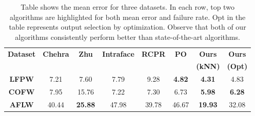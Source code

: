 \begin{table}%
   \centering
   \begin{tabular}{c c c c c c c c}
    \toprule[1.5pt]
     {\bf Dataset} &  {\bf Chehra} &  {\bf Zhu} &  {\bf Intraface} &  {\bf RCPR} & {\bf PO} & {\bf Ours} & {\bf Ours} \\
     & & & & & & \bf(kNN) & \bf(Opt) \\
    \midrule
    {\bf LFPW} &  7.21 & 7.60 & 7.79 & 9.28 & {\bf 4.82} & {\bf 4.31 } & 4.83 \\ 
    {\bf COFW} &  7.95 & 15.76 & 7.22 & 7.30 & 6.73 &{\bf 5.98 } & {\bf 6.28} \\
    {\bf AFLW} &  40.44 & {\bf 25.88} & 47.98 & 39.78 & 46.67 & {\bf 19.93} & 32.08 \\ 
    \bottomrule[1.5pt]

    \end{tabular}
    \caption{Table shows the mean error for three datasets. In each row, top two algorithms are highlighted for both mean error and failure rate. Opt in the table represents output selection by optimization. Observe that both of our algorithms consistently perform better than state-of-the-art algorithms. }
    \label{table:ourBestResults_mean}
\end{table}

